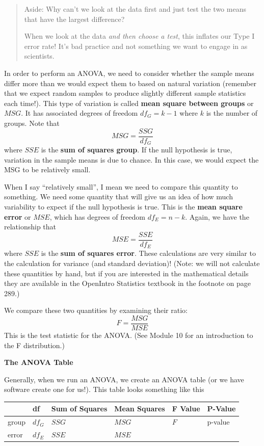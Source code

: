 \documentclass[
]{book}
\begin{document}
\begin{quote}
Aside: Why can't we look at the data first and just test the two means that have the largest difference?

When we look at the data \emph{and then choose a test}, this inflates our Type I error rate! It's bad practice and not something we want to engage in as scientists.
\end{quote}

In order to perform an ANOVA, we need to consider whether the sample means differ more than we would expect them to based on natural variation (remember that we expect random samples to produce slightly different sample statistics each time!). This type of variation is called \textbf{mean square between groups} or \(MSG\). It has associated degrees of freedom \(df_G = k-1\) where \(k\) is the number of groups. Note that \[MSG = \frac{SSG}{df_G}\] where \(SSE\) is the \textbf{sum of squares group}. If the null hypothesis is true, variation in the sample means is due to chance. In this case, we would expect the MSG to be relatively small.

When I say ``relatively small'', I mean we need to compare this quantity to something. We need some quantity that will give us an idea of how much variability to expect if the null hypothesis is true. This is the \textbf{mean square error} or \(MSE\), which has degrees of freedom \(df_E = n-k\). Again, we have the relationship that \[MSE = \frac{SSE}{df_E}\] where \(SSE\) is the \textbf{sum of squares error}. These calculations are very similar to the calculation for variance (and standard deviation)! (Note: we will not calculate these quantities by hand, but if you are interested in the mathematical details they are available in the OpenIntro Statistics textbook in the footnote on page 289.)

We compare these two quantities by examining their ratio: \[F = \frac{MSG}{MSE}\] This is the test statistic for the ANOVA. (See Module 10 for an introduction to the F distribution.)

\textbf{The ANOVA Table}

Generally, when we run an ANOVA, we create an ANOVA table (or we have software create one for us!). This table looks something like this

\begin{longtable}[]{@{}llllll@{}}
\toprule\noalign{}
& df & Sum of Squares & Mean Squares & F Value & P-Value \\
\midrule\noalign{}
\endhead
\bottomrule\noalign{}
\endlastfoot
group & \(df_G\) & \(SSG\) & \(MSG\) & \(F\) & p-value \\
error & \(df_E\) & \(SSE\) & \(MSE\) & & \\
\end{longtable}
\end{document}
